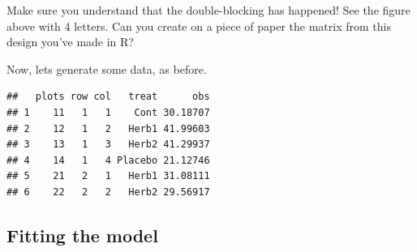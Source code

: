 \documentclass[
]{book}
\newenvironment{Shaded}{\begin{snugshade}}{\end{snugshade}}
\newcommand{\CommentTok}[1]{\textcolor[rgb]{0.56,0.35,0.01}{\textit{#1}}}
\newcommand{\DecValTok}[1]{\textcolor[rgb]{0.00,0.00,0.81}{#1}}
\newcommand{\FunctionTok}[1]{\textcolor[rgb]{0.00,0.00,0.00}{#1}}
\newcommand{\NormalTok}[1]{#1}
\newcommand{\OtherTok}[1]{\textcolor[rgb]{0.56,0.35,0.01}{#1}}
\newcommand{\SpecialCharTok}[1]{\textcolor[rgb]{0.00,0.00,0.00}{#1}}
\newcommand{\StringTok}[1]{\textcolor[rgb]{0.31,0.60,0.02}{#1}}
\begin{document}
Make sure you understand that the double-blocking has happened! See the figure above with 4 letters. Can you create on a piece of paper the matrix from this design you've made in R?

Now, lets generate some data, as before.

\begin{Shaded}
\end{Shaded}

\begin{verbatim}
##   plots row col   treat      obs
## 1    11   1   1    Cont 30.18707
## 2    12   1   2   Herb1 41.99603
## 3    13   1   3   Herb2 41.29937
## 4    14   1   4 Placebo 21.12746
## 5    21   2   1   Herb1 31.08111
## 6    22   2   2   Herb2 29.56917
\end{verbatim}

\hypertarget{fitting-the-model}{%
\subsection{Fitting the model}\label{fitting-the-model}}
\end{document}
